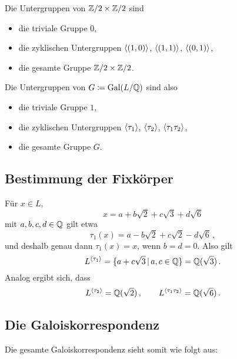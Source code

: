 Die Untergruppen von $\mathbb{Z}/2 \times \mathbb{Z}/2$ sind
\begin{itemize}
  \item
    die triviale Gruppe $0$,
  \item
    die zyklischen Untergruppen $\langle(1,0)\rangle$, $\langle(1,1)\rangle$, $\langle(0,1)\rangle$,
  \item
    die gesamte Gruppe $\mathbb{Z}/2 \times \mathbb{Z}/2$.
\end{itemize}
Die Untergruppen von $G \coloneqq \operatorname{Gal}(L/\mathbb{Q})$ sind also
\begin{itemize}
  \item
    die triviale Gruppe $1$,
  \item
    die zyklischen Untergruppen $\langle\tau_1\rangle$, $\langle\tau_2\rangle$, $\langle\tau_1 \tau_2\rangle$,
  \item
    die gesamte Gruppe $G$.
\end{itemize}

\subsection{Bestimmung der Fixkörper}

Für $x \in L$,
\[
  x = a + b\sqrt{2} + c\sqrt{3} + d\sqrt{6}
\]
mit $a, b, c, d \in \mathbb{Q}$ gilt etwa
\[
  \tau_1(x) = a - b\sqrt{2} + c \sqrt{2} - d\sqrt{6} \,,
\]
und deshalb genau dann $\tau_1(x) = x$, wenn $b = d = 0$.
Also gilt
\[
    L^{\generated{\tau_1}}
  = \{
      a + c\sqrt{3}
    \suchthat
      a,c \in \Rational
    \}
  = \Rational(\sqrt{3}) \,.
\]
Analog ergibt sich, dass
\[
    L^{\langle\tau_2\rangle}
  = \mathbb{Q}(\sqrt{2}) \,,
  \qquad
    L^{\langle\tau_1 \tau_2\rangle}
  = \mathbb{Q}(\sqrt{6}) \,.
\]

\subsection{Die Galoiskorrespondenz}

Die gesamte Galoiskorrespondenz sieht somit wie folgt aus:

